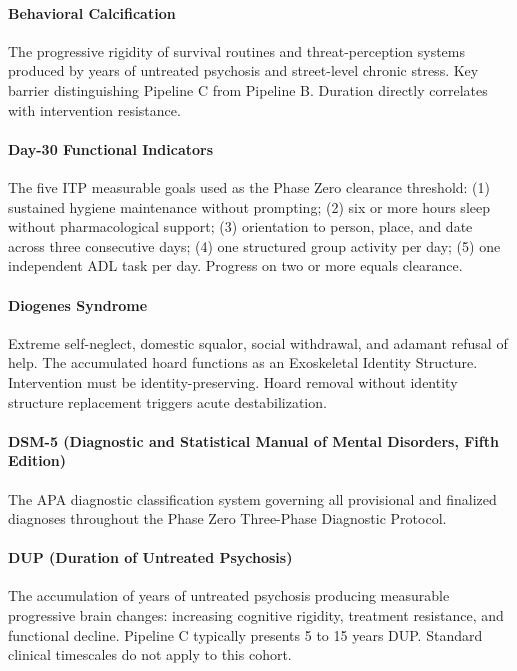 {\paragraph{Behavioral Calcification} The progressive rigidity of survival routines and threat-perception systems produced by years of untreated psychosis and street-level chronic stress. Key barrier distinguishing Pipeline C from Pipeline B. Duration directly correlates with intervention resistance.

\paragraph{Day-30 Functional Indicators} The five ITP measurable goals used as the Phase Zero clearance threshold: (1) sustained hygiene maintenance without prompting; (2) six or more hours sleep without pharmacological support; (3) orientation to person, place, and date across three consecutive days; (4) one structured group activity per day; (5) one independent ADL task per day. Progress on two or more equals clearance.

\paragraph{Diogenes Syndrome} Extreme self-neglect, domestic squalor, social withdrawal, and adamant refusal of help. The accumulated hoard functions as an Exoskeletal Identity Structure. Intervention must be identity-preserving. Hoard removal without identity structure replacement triggers acute destabilization.

\paragraph{DSM-5 (Diagnostic and Statistical Manual of Mental Disorders, Fifth Edition)} The APA diagnostic classification system governing all provisional and finalized diagnoses throughout the Phase Zero Three-Phase Diagnostic Protocol.

\paragraph{DUP (Duration of Untreated Psychosis)} The accumulation of years of untreated psychosis producing measurable progressive brain changes: increasing cognitive rigidity, treatment resistance, and functional decline. Pipeline C typically presents 5 to 15 years DUP. Standard clinical timescales do not apply to this cohort.

}
